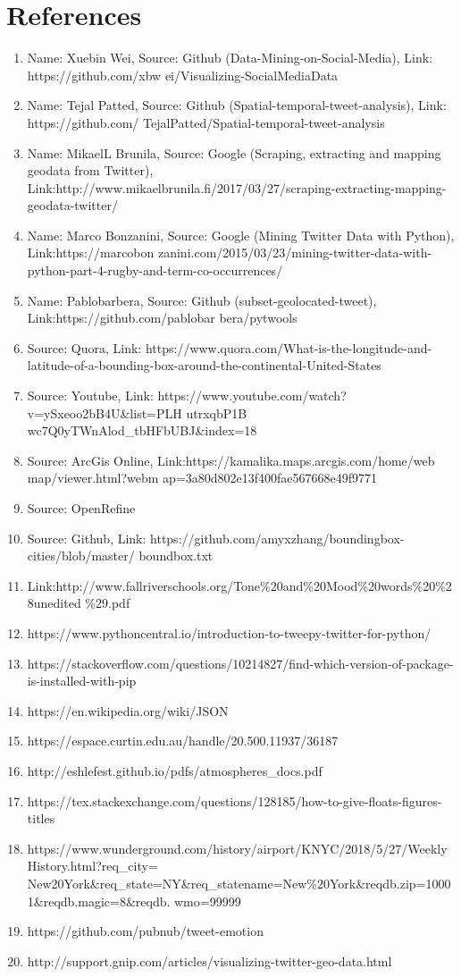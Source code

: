 \documentclass[12pt, oneside]{article}   	%
\begin{document}
\section{ \Large References}
\begin{enumerate}
	\item Name: Xuebin Wei, Source: Github (Data-Mining-on-Social-Media), Link: https://github.com/xbw
	ei/Visualizing-Social\-Media\-Data
	\item  Name: Tejal Patted, Source: Github (Spatial-temporal-tweet-analysis), Link: https://github.com/
	TejalPatted/Spatial-temporal-tweet-analysis
	\item  Name: MikaelL Brunila, Source: Google (Scraping, extracting and mapping geodata from Twitter), Link:http://www.mikaelbrunila.fi/2017/03/27/scraping-extracting-mapping-geodata-twitter/
	\item  Name: Marco Bonzanini, Source: Google (Mining Twitter Data with Python), Link:https://marcobon
	zanini.com/2015/03/23/mining-twitter-data-with-python-part-4-rugby-and-term-co-occurrences/
	\item  Name: Pablobarbera, Source: Github (subset-geolocated-tweet), Link:https://github.com/pablobar
	bera/pytwools
	\item Source: Quora, Link: https://www.quora.com/What-is-the-longitude-and-latitude-of-a-bounding-box-around-the-continental-United-States
	\item Source: Youtube, Link: https://www.youtube.com/watch?v=ySxeoo2bB4U\&list=PLH
	utrxqbP1B
	wc7Q0yTWnAlod\_tbHFbUBJ\&index=18
	\item Source: ArcGis Online, Link:https://kamalika.maps.arcgis.com/home/web
	map/viewer.html?webm
	ap=3a80d802e13f400fae567668e49f9771
	\item Source: OpenRefine
	\item Source: Github, Link: https://github.com/amyxzhang/boundingbox-cities/blob/master/
	boundbox.txt
	\item Link:http://www.fallriverschools.org/Tone\%20and\%20Mood\%20words\%20\%28unedited
	\%29.pdf
	\item https://www.pythoncentral.io/introduction-to-tweepy-twitter-for-python/
	\item https://stackoverflow.com/questions/10214827/find-which-version-of-package-is-installed-with-pip
	\item https://en.wikipedia.org/wiki/JSON
	\item https://espace.curtin.edu.au/handle/20.500.11937/36187
	\item http://eshlefest.github.io/pdfs/atmospheres\_docs.pdf
	\item https://tex.stackexchange.com/questions/128185/how-to-give-floats-figures-titles
	\item https://www.wunderground.com/history/airport/KNYC/2018/5/27/WeeklyHistory.html?req\_city=
	New20York\&req\_state=NY\&req\_statename=New\%20York\&reqdb.zip=10001\&reqdb.magic=8\&reqdb.
	wmo=99999
	\item https://github.com/pubnub/tweet-emotion
	\item http://support.gnip.com/articles/visualizing-twitter-geo-data.html
\end{enumerate}
\end{document}

